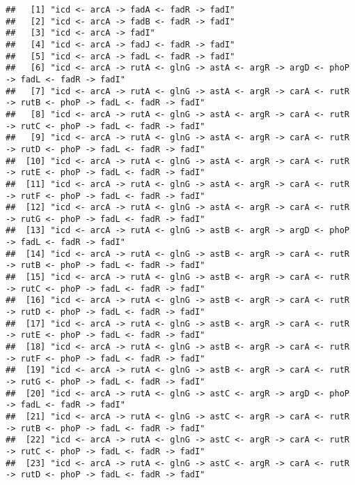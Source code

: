 \documentclass[
]{article}
\begin{document}
\begin{verbatim}
##   [1] "icd <- arcA -> fadA <- fadR -> fadI"                                                                
##   [2] "icd <- arcA -> fadB <- fadR -> fadI"                                                                
##   [3] "icd <- arcA -> fadI"                                                                                
##   [4] "icd <- arcA -> fadJ <- fadR -> fadI"                                                                
##   [5] "icd <- arcA -> fadL <- fadR -> fadI"                                                                
##   [6] "icd <- arcA -> rutA <- glnG -> astA <- argR -> argD <- phoP -> fadL <- fadR -> fadI"                
##   [7] "icd <- arcA -> rutA <- glnG -> astA <- argR -> carA <- rutR -> rutB <- phoP -> fadL <- fadR -> fadI"
##   [8] "icd <- arcA -> rutA <- glnG -> astA <- argR -> carA <- rutR -> rutC <- phoP -> fadL <- fadR -> fadI"
##   [9] "icd <- arcA -> rutA <- glnG -> astA <- argR -> carA <- rutR -> rutD <- phoP -> fadL <- fadR -> fadI"
##  [10] "icd <- arcA -> rutA <- glnG -> astA <- argR -> carA <- rutR -> rutE <- phoP -> fadL <- fadR -> fadI"
##  [11] "icd <- arcA -> rutA <- glnG -> astA <- argR -> carA <- rutR -> rutF <- phoP -> fadL <- fadR -> fadI"
##  [12] "icd <- arcA -> rutA <- glnG -> astA <- argR -> carA <- rutR -> rutG <- phoP -> fadL <- fadR -> fadI"
##  [13] "icd <- arcA -> rutA <- glnG -> astB <- argR -> argD <- phoP -> fadL <- fadR -> fadI"                
##  [14] "icd <- arcA -> rutA <- glnG -> astB <- argR -> carA <- rutR -> rutB <- phoP -> fadL <- fadR -> fadI"
##  [15] "icd <- arcA -> rutA <- glnG -> astB <- argR -> carA <- rutR -> rutC <- phoP -> fadL <- fadR -> fadI"
##  [16] "icd <- arcA -> rutA <- glnG -> astB <- argR -> carA <- rutR -> rutD <- phoP -> fadL <- fadR -> fadI"
##  [17] "icd <- arcA -> rutA <- glnG -> astB <- argR -> carA <- rutR -> rutE <- phoP -> fadL <- fadR -> fadI"
##  [18] "icd <- arcA -> rutA <- glnG -> astB <- argR -> carA <- rutR -> rutF <- phoP -> fadL <- fadR -> fadI"
##  [19] "icd <- arcA -> rutA <- glnG -> astB <- argR -> carA <- rutR -> rutG <- phoP -> fadL <- fadR -> fadI"
##  [20] "icd <- arcA -> rutA <- glnG -> astC <- argR -> argD <- phoP -> fadL <- fadR -> fadI"                
##  [21] "icd <- arcA -> rutA <- glnG -> astC <- argR -> carA <- rutR -> rutB <- phoP -> fadL <- fadR -> fadI"
##  [22] "icd <- arcA -> rutA <- glnG -> astC <- argR -> carA <- rutR -> rutC <- phoP -> fadL <- fadR -> fadI"
##  [23] "icd <- arcA -> rutA <- glnG -> astC <- argR -> carA <- rutR -> rutD <- phoP -> fadL <- fadR -> fadI"

\end{verbatim}
\end{document}

